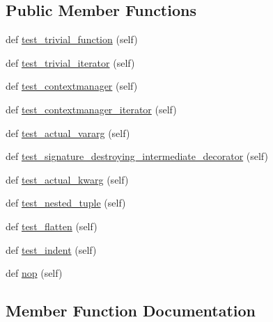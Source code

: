 \subsection*{Public Member Functions}
\begin{DoxyCompactItemize}
\item 
def \hyperlink{classnetworkx_1_1utils_1_1tests_1_1test__decorators_1_1TestArgmap_ab92cb1120cf4590b501c1e353cebc074}{test\+\_\+trivial\+\_\+function} (self)
\item 
def \hyperlink{classnetworkx_1_1utils_1_1tests_1_1test__decorators_1_1TestArgmap_ae5e25b80315e005da05ef3d3c91ec185}{test\+\_\+trivial\+\_\+iterator} (self)
\item 
def \hyperlink{classnetworkx_1_1utils_1_1tests_1_1test__decorators_1_1TestArgmap_ac6678d8b29dec54c680876142fae5f58}{test\+\_\+contextmanager} (self)
\item 
def \hyperlink{classnetworkx_1_1utils_1_1tests_1_1test__decorators_1_1TestArgmap_a4204313f5eb36881b293266b6629b460}{test\+\_\+contextmanager\+\_\+iterator} (self)
\item 
def \hyperlink{classnetworkx_1_1utils_1_1tests_1_1test__decorators_1_1TestArgmap_a5bf589cba5f6927dabc495b1e1c94364}{test\+\_\+actual\+\_\+vararg} (self)
\item 
def \hyperlink{classnetworkx_1_1utils_1_1tests_1_1test__decorators_1_1TestArgmap_ade195c42293ed6e7b1a72aefb40d2bfb}{test\+\_\+signature\+\_\+destroying\+\_\+intermediate\+\_\+decorator} (self)
\item 
def \hyperlink{classnetworkx_1_1utils_1_1tests_1_1test__decorators_1_1TestArgmap_a4ce0b2d48ed7a569667985bdb205742a}{test\+\_\+actual\+\_\+kwarg} (self)
\item 
def \hyperlink{classnetworkx_1_1utils_1_1tests_1_1test__decorators_1_1TestArgmap_aeb629a844d9bbd8e2bbe428c6b5d2f55}{test\+\_\+nested\+\_\+tuple} (self)
\item 
def \hyperlink{classnetworkx_1_1utils_1_1tests_1_1test__decorators_1_1TestArgmap_a2eaab83adf1ccf0d545e60c2291b8266}{test\+\_\+flatten} (self)
\item 
def \hyperlink{classnetworkx_1_1utils_1_1tests_1_1test__decorators_1_1TestArgmap_abdadf528ddd98ba1d275038717446b40}{test\+\_\+indent} (self)
\item 
def \hyperlink{classnetworkx_1_1utils_1_1tests_1_1test__decorators_1_1TestArgmap_a27fbc40b4875aa504a197872d7bf6905}{nop} (self)
\end{DoxyCompactItemize}


\subsection{Member Function Documentation}
\mbox{\label{classnetworkx_1_1utils_1_1tests_1_1test__decorators_1_1TestArgmap_a27fbc40b4875aa504a197872d7bf6905}} 
